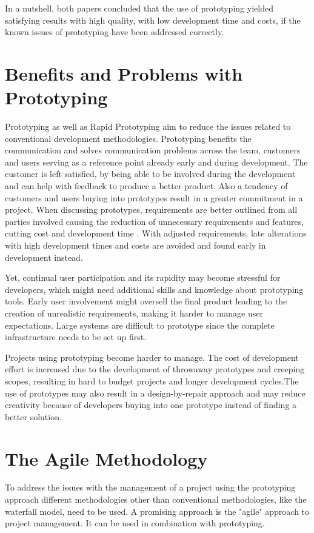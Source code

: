 \documentclass[runningheads]{llncs}
\begin{document}
In a nutshell, both papers concluded that the use of prototyping yielded satisfying results with high quality, with low
development time and costs, if the known issues of prototyping have been addressed correctly.


\section{Benefits and Problems with Prototyping}
Prototyping as well as Rapid Prototyping aim to reduce the issues related to conventional development methodologies. Prototyping
benefits the communication and solves communication problems across the team, customers and users\cite{ref_RPalternativeStrategy} serving as a reference point already 
early and during development\cite{ref_prac}. The customer is left satisfied, by being able to be involved during the development 
and can help with feedback to produce a better product. Also a tendency of customers and users buying into prototypes result in a greater
commitment in a project. When discussing prototypes, requirements are better outlined from all parties involved causing the reduction
of unnecessary requirements and features, cutting cost and development time \cite{ref_prac}. With adjusted requirements, 
late alterations with high development times and costs are avoided and found early in development instead.

Yet, continual user participation and its rapidity may become stressful for developers, which might need additional skills and knowledge about
prototyping tools. Early user involvement might oversell the final product leading to the creation of unrealistic requirements, making it harder 
to manage user expectations. Large systems are difficult to prototype since the complete infrastructure needs to be set up first\cite{ref_prac}.

Projects using prototyping become harder to manage. The cost of development effort is increased due to the development of throwaway prototypes 
and creeping scopes, resulting in hard to budget projects and longer development cycles.The use of prototypes may also result in a design-by-repair
approach and may reduce creativity because of developers buying into one prototype instead of finding a better solution.

\section{The Agile Methodology}
To address the issues with the management of a project using the prototyping approach different methodologies other than 
conventional methodologies, like the waterfall model, need to be used. A promising approach is the "agile" approach
to project management. It can be used in combination with prototyping.
\end{document}
